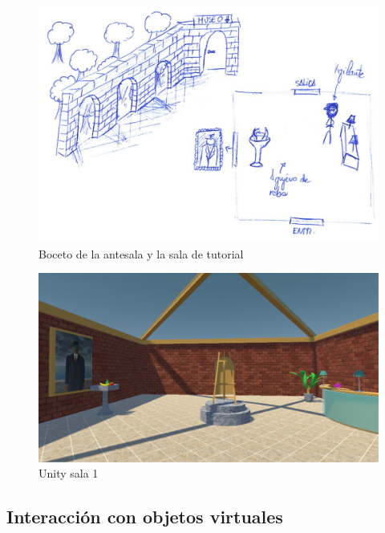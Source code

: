 \begin{figure}[!h]
\begin{center}
\includegraphics[width=1\textwidth]{imagenes/7/bocetos/boceto-sala-0-1.png}
\caption{Boceto de la antesala y la sala de tutorial}
\label{fig:bocetos-salas-0-1}
\end{center}
\end{figure}


\begin{figure}[!h]
\begin{center}
\includegraphics[width=1\textwidth]{imagenes/7/salas-unity/unity-sala-1.png}
\caption{Unity sala 1}
\label{fig:unity-sala-1}
\end{center}
\end{figure}

\subsection{Interacción con objetos virtuales}


